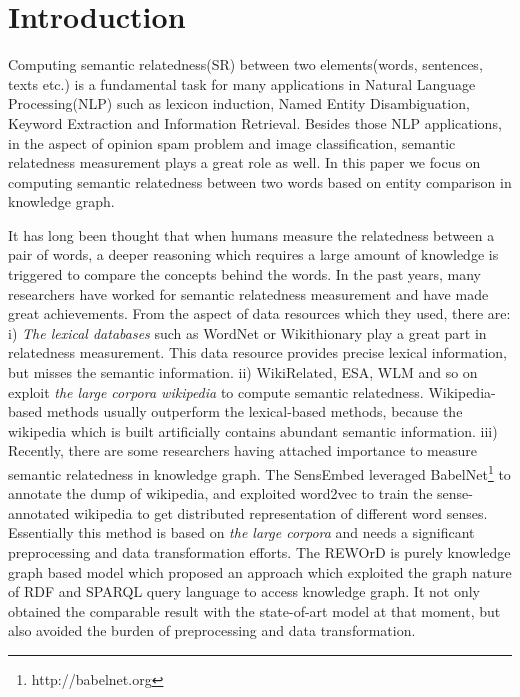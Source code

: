 \section{Introduction}
Computing semantic relatedness(SR) between two elements(words, sentences,
texts etc.) is a fundamental task for many applications in Natural Language
Processing(NLP) such as lexicon induction\cite{aaai/QadirMGL15}, Named 
Entity Disambiguation\cite{acl/HanZ10}, Keyword Extraction
\cite{ijcai/ZhangFW13} and Information Retrieval\cite{acl/GurevychMZ07}. 
Besides those NLP applications, in the aspect of opinion spam problem\cite{www/SandulescuE15}
and image classification\cite{iwcs/LeongM11}, semantic relatedness measurement plays a great role as well. 
In this paper we focus on computing semantic relatedness between two words based on entity comparison in knowledge graph.

It has long been thought that when humans measure the relatedness between a pair of words,
a deeper reasoning which requires a large amount of knowledge is triggered to compare the concepts behind the words.
In the past years, many researchers have worked for semantic relatedness measurement and have made great achievements.
From the aspect of data resources which they used, there are:
i) \emph{The lexical databases} such as WordNet\cite{acl/Pucher07} or Wikithionary\cite{aaai/ZeschMG08} play a great part in
relatedness measurement. This data resource provides precise lexical information, but misses the semantic information.
ii) WikiRelated\cite{aaai/StrubeP06}, ESA\cite{ijcai/GabrilovichM07}, WLM\cite{aaai/ZeschMG08} and so on exploit \emph{the large corpora wikipedia}
to compute semantic relatedness. Wikipedia-based methods usually outperform the lexical-based methods, 
because the wikipedia which is built artificially contains abundant semantic information. 
iii) Recently, there are some researchers having attached importance to measure semantic relatedness
in knowledge graph. 
The SensEmbed \cite{acl/IacobacciPN15} leveraged BabelNet\footnote{http://babelnet.org} to annotate the dump of wikipedia,
and exploited word2vec\cite{corr/Mikolov13} to train the sense-annotated wikipedia to get distributed representation of different 
word senses. Essentially this method is based on \emph{the large corpora} and needs a significant preprocessing
and data transformation efforts. 
The REWOrD \cite{aaai/Pirro12} is purely knowledge graph based model which proposed an approach which exploited 
the graph nature of RDF and SPARQL query language to access knowledge graph. It not only obtained the comparable
result with the state-of-art model at that moment, but also avoided the burden of preprocessing and data transformation.

